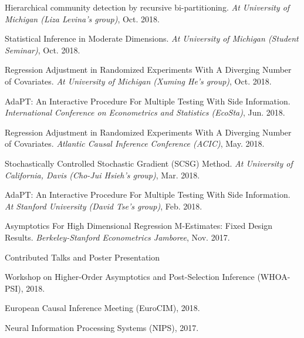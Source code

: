 \documentclass{article}
\begin{document}
\vspace{2mm}
Hierarchical community detection by recursive bi-partitioning. \emph{At University of Michigan (Liza Levina's group)}, Oct. 2018.

\vspace{2mm}
Statistical Inference in Moderate Dimensions. \emph{At University of Michigan (Student Seminar)}, Oct. 2018.

\vspace{2mm}
Regression Adjustment in Randomized Experiments With A Diverging Number of Covariates. \emph{At University of Michigan (Xuming He's group)}, Oct. 2018.

\vspace{2mm}
AdaPT: An Interactive Procedure For Multiple Testing With Side Information. \emph{International Conference on Econometrics and Statistics (EcoSta)}, Jun. 2018.

\vspace{2mm}
Regression Adjustment in Randomized Experiments With A Diverging Number of Covariates. \emph{Atlantic Causal Inference Conference (ACIC)}, May. 2018.

\vspace{2mm}
Stochastically Controlled Stochastic Gradient (SCSG) Method. \emph{At University of California, Davis (Cho-Jui Hsieh's group)}, Mar. 2018.

\vspace{2mm}
AdaPT: An Interactive Procedure For Multiple Testing With Side Information. \emph{At Stanford University (David Tse's group)}, Feb. 2018.

\vspace{2mm}
Asymptotics For High Dimensional Regression M-Estimates: Fixed Design Results. \emph{Berkeley-Stanford Econometrics Jamboree}, Nov. 2017. 

\vspace{5mm}

\begin{large}
\noindent Contributed Talks and Poster Presentation
\end{large}

\vspace{2mm}
Workshop on Higher-Order Asymptotics and Post-Selection Inference (WHOA-PSI), 2018.

\vspace{2mm}
European Causal Inference Meeting (EuroCIM), 2018.

\vspace{2mm}
Neural Information Processing Systems (NIPS), 2017.
\end{document}
